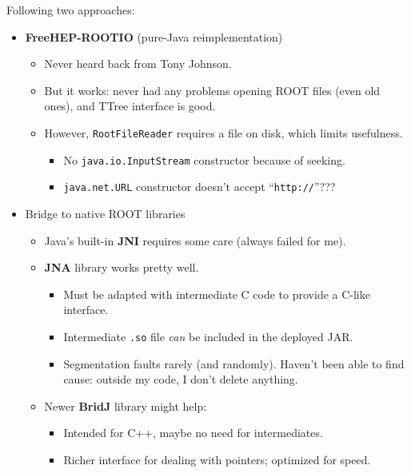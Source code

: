 \documentclass{beamer}
\begin{document}
\begin{frame}{Following two approaches:}
\begin{itemize}
\item<1-> {\bf FreeHEP-ROOTIO} (pure-Java reimplementation)
\begin{itemize}
\item Never heard back from Tony Johnson.
\item But it works: never had any problems opening ROOT files (even old ones), and TTree interface is good.
\item However, {\tt RootFileReader} requires a file on disk, which limits usefulness.
\begin{itemize}
\item No {\tt java.io.InputStream} constructor because of seeking.
\item {\tt java.net.URL} constructor doesn't accept ``{\tt http://}''???
\end{itemize}
\end{itemize}

\item<2> Bridge to native ROOT libraries
\begin{itemize}
\item Java's built-in {\bf JNI} requires some care (always failed for me).
\item {\bf JNA} library works pretty well.
\begin{itemize}
\item Must be adapted with intermediate C code to provide a C-like interface.
\item Intermediate {\tt .so} file {\it can} be included in the deployed JAR.
\item Segmentation faults rarely (and randomly). Haven't been able to find cause: outside my code, I don't delete anything.
\end{itemize}
\item Newer {\bf BridJ} library might help:
\begin{itemize}
\item Intended for C++, maybe no need for intermediates.
\item Richer interface for dealing with pointers; optimized for speed.
\end{itemize}
\end{itemize}
\end{itemize}
\end{frame}
\end{document}
